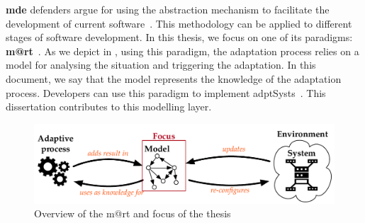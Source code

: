 \textbf{\Gls{mde}} defenders argue for using the abstraction mechanism to facilitate the development of current software~\cite{DBLP:journals/computer/Schmidt06, DBLP:conf/ifm/Kent02, DBLP:series/synthesis/2017Brambilla}.
This methodology can be applied to different stages of software development.
In this thesis, we focus on one of its paradigms: \textbf{\gls{m@rt}}~\cite{DBLP:journals/computer/BlairBF09, DBLP:journals/computer/MorinBJFS09}.
As we depict in , using this paradigm, the adaptation process relies on a \gls{model} for analysing the situation and triggering the adaptation.
In this document, we say that the model represents the knowledge of the adaptation process.
Developers can use this paradigm to implement \glspl{adptSyst}~\cite{DBLP:journals/computer/MorinBJFS09, DBLP:conf/smartgridsec/0001FKNT14}.
This dissertation contributes to this modelling layer.



\begin{figure}
	\centering
	\includegraphics[width=.9\linewidth]{img/chapt-intro/context/mart-focus}
	\caption{Overview of the \gls{m@rt} and focus of the thesis}
	\label{fig:intro:context:m@rt}
\end{figure}
